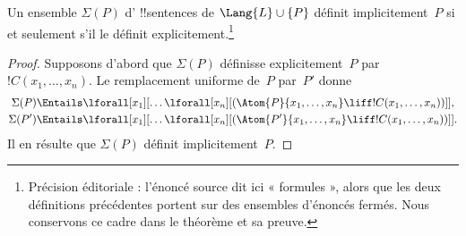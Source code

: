 \documentclass[../../../include/open-logic-section]{subfiles}
\begin{document}
\begin{thm}
Un ensemble $\Sigma(P)$ d'%
!!{sentence}s de $\Lang{L}\cup\{P\}$
définit implicitement~$P$ si et
seulement s'il le définit
explicitement.\footnote{Précision éditoriale : l'énoncé source dit ici « formules », alors que les deux définitions précédentes portent sur des ensembles d'énoncés fermés. Nous conservons ce cadre dans le théorème et sa preuve.}
\end{thm}

\begin{proof}
Supposons d'abord que $\Sigma(P)$
définisse explicitement~$P$ par
$!C(x_1,\dots,x_n)$. Le remplacement
uniforme de~$P$ par~$P'$ donne
\begin{align*}
  \Sigma(P)&\Entails
    \lforall[x_1][\dots\lforall[x_n]
    [(\Atom{P}{x_1,\dots,x_n}
    \liff !C(x_1,\dots,x_n))]],\\
  \Sigma(P')&\Entails
    \lforall[x_1][\dots\lforall[x_n]
    [(\Atom{P'}{x_1,\dots,x_n}
    \liff !C(x_1,\dots,x_n))]].
\end{align*}
Il en résulte que $\Sigma(P)$
définit implicitement~$P$.


\end{proof}
\end{document}
